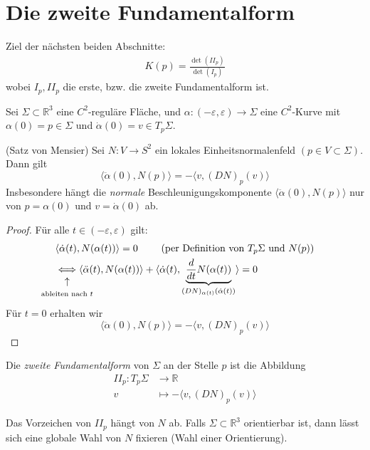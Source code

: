 \documentclass[../main.tex]{subfiles}
\begin{document}
\section{Die zweite Fundamentalform}
\begin{motivation}
    Ziel der nächsten beiden Abschnitte:
    \begin{align*}
        K(p) = \frac{\det(II_{p})}{\det(I_{p})}
    \end{align*}
    wobei $I_{p}, II_{p}$ die erste, bzw. die zweite Fundamentalform ist.
\end{motivation}

Sei $\Sigma \subset \mathbb{R}^{3}$ eine $C^{2}$-reguläre Fläche, und $\alpha:(-\varepsilon, \varepsilon)\rightarrow \Sigma$ eine $C^{2}$-Kurve mit $\alpha(0) = p \in \Sigma$ und $\dot{\alpha}(0) = v \in T_{p}\Sigma$. 
\begin{proposition}
    (Satz von Mensier) Sei $N: V \rightarrow S^{2}$ ein lokales Einheitsnormalenfeld $(p\in V\subset\Sigma)$. Dann gilt $$\langle \ddot{\alpha}(0), N(p)\rangle = -\langle v, (DN)_{p}(v)\rangle$$
    Insbesondere hängt die \emph{normale} Beschleunigungskomponente $\langle\ddot{\alpha}(0), N(p)\rangle$ nur von \linebreak $p = \alpha(0)$ und $v = \dot{\alpha}(0)$ ab.
\end{proposition}
\begin{proof}
    Für alle $t \in (-\varepsilon,\varepsilon)$ gilt:
    \begin{align*}
        &\langle \dot{\alpha}(t), N(\alpha(t))\rangle = 0 \qquad \text{ (per Definition von } T_{p}\Sigma \text{ und } N(p))\\
        &\vertarrowbox[1ex]{\iff}{ableiten nach $t$} \langle \ddot{\alpha}(t),N(\alpha(t))\rangle + \langle \dot{\alpha}(t), \underbrace{\frac{d}{dt}N(\alpha(t))}_{(DN)_{\alpha(t)}(\dot{\alpha}(t))} \rangle = 0
    \end{align*}
    Für $t=0$ erhalten wir
    $$\langle\ddot{\alpha}(0), N(p)\rangle = -\langle v, (DN)_{p}(v)\rangle$$
\end{proof}
\begin{definition}
    Die \emph{zweite Fundamentalform} von $\Sigma$ an der Stelle $p$ ist die Abbildung
    \begin{align*}
        II_{p}:T_{p}\Sigma &\rightarrow \mathbb{R}\\
        v &\mapsto -\langle v, (DN)_{p}(v)\rangle 
    \end{align*}
\end{definition}
\begin{remark}
    Das Vorzeichen von $II_{p}$ hängt von $N$ ab. Falls $\Sigma \subset \mathbb{R}^{3}$ orientierbar ist, 
    dann lässt sich eine globale Wahl von $N$ fixieren (Wahl einer Orientierung).
\end{remark}
\end{document}
